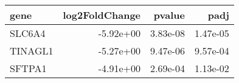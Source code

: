\begin{tabular}{lrrr}
\toprule
   gene &  log2FoldChange &   pvalue &     padj \\
\midrule
 SLC6A4 &       -5.92e+00 & 3.83e-08 & 1.47e-05 \\
TINAGL1 &       -5.27e+00 & 9.47e-06 & 9.57e-04 \\
 SFTPA1 &       -4.91e+00 & 2.69e-04 & 1.13e-02 \\
\bottomrule
\end{tabular}
